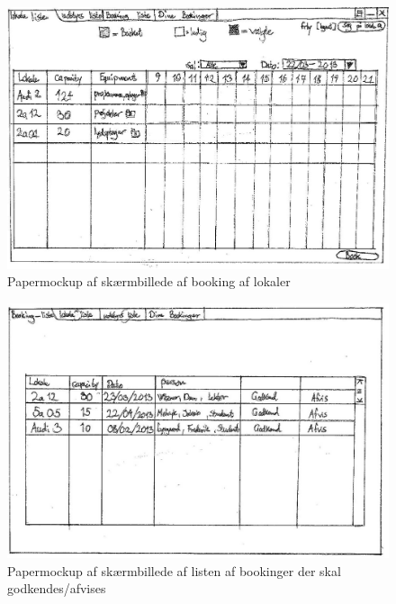 \begin{figure}[h!]
  \centering
    \includegraphics[angle=90, height=0.9\textheight]{Appendix/GUI-Prototype/PaperMockup/LokaleListe_001}
  \caption{Papermockup af skærmbillede af booking af lokaler}
\label{App_GUI_paper_LokaleListe}
\end{figure}

\begin{figure}[h!]
  \centering
    \includegraphics[angle=90, height=0.9\textheight]{Appendix/GUI-Prototype/PaperMockup/GodkendBookinger_001}
  \caption{Papermockup af  skærmbillede af listen af bookinger der skal godkendes/afvises}
\label{App_GUI_paper_GodkendBookinger}
\end{figure}

